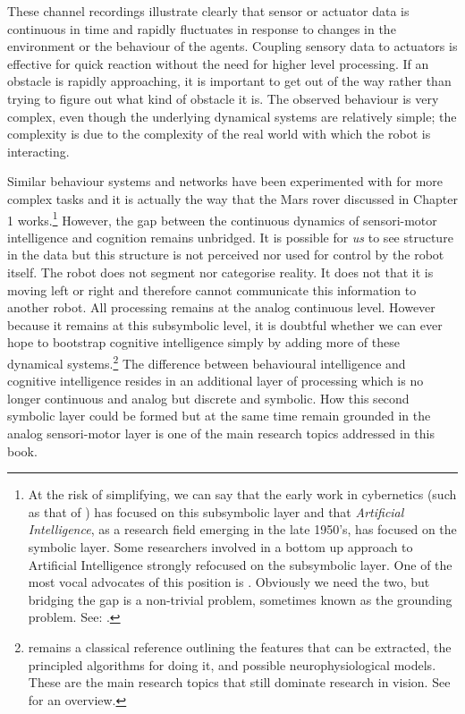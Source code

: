 These channel recordings illustrate clearly that sensor or actuator
data is continuous in time and 
rapidly fluctuates in response to changes in the environment or the
behaviour of the agents. Coupling sensory data to actuators
is effective for quick reaction
without the need for higher level processing. If 
an obstacle is rapidly approaching, it is important to get out 
of the way rather than trying to figure out what kind of 
obstacle it is. The observed behaviour is very complex, even though
the underlying dynamical systems are relatively 
simple; the complexity is due to the complexity of the 
real world with which the robot is interacting. 

Similar behaviour systems and networks have
been experimented with 
for more complex tasks and it is actually the way that 
the Mars rover discussed in Chapter 1 works.\footnote{At 
the risk of simplifying, we can say that the early 
work in cybernetics (such as that of \cite{Braitenberg:1984}) 
has focused on this subsymbolic layer
and that {\itshape Artificial Intelligence}, as a research field
emerging in the late 1950's, has focused on the 
symbolic layer. Some researchers involved in a bottom up 
approach to Artificial Intelligence strongly refocused
on the subsymbolic layer. One of the most
vocal advocates of this position is \cite{Brooks:1992}.
Obviously we need the two, 
but bridging the gap is a non-trivial problem, sometimes known 
as the grounding problem. See: \cite{Harnad:1994}. }
However, the gap between the continuous dynamics of sensori-motor
intelligence and cognition remains unbridged. 
It is possible for {\itshape us} to see 
structure in the data but this structure is not perceived
nor used for control by the robot itself. 
The robot does not segment nor categorise
reality. It does not  that it is moving left or right 
and therefore cannot communicate this information to another robot. 
All processing remains at the analog continuous
level. However because it remains at this subsymbolic level, it is doubtful
whether we can ever hope to bootstrap cognitive
intelligence simply by adding more of these dynamical 
systems.\footnote{
\cite{Marr:1982} remains a classical reference outlining
the features that can be extracted, the
principled algorithms for doing it, and possible 
neurophysiological models. These are the main research
topics that still dominate research in vision. See 
\cite{Ullman:1996} for an overview.}
The difference between behavioural intelligence 
and cognitive intelligence resides in an additional 
layer of processing which is no longer continuous and analog 
but discrete and symbolic. How this second symbolic 
layer could be formed but at the same time remain 
grounded in the analog sensori-motor layer is one 
of the main research topics addressed in this book. 

